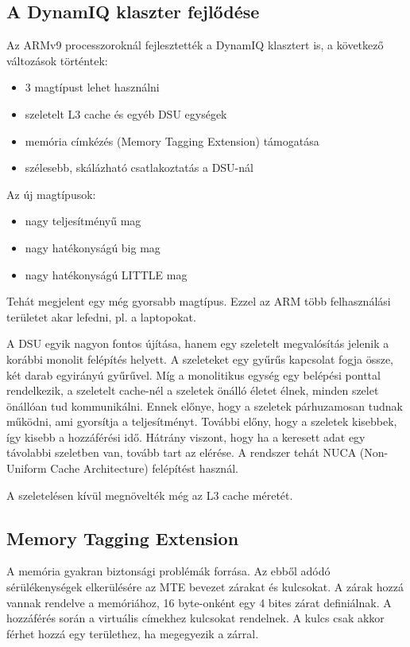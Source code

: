 \subsection{A DynamIQ klaszter fejlődése}
Az ARMv9 processzoroknál fejlesztették a DynamIQ klasztert is, a következő változások történtek:
\begin{itemize}
    \item 3 magtípust lehet használni
    \item szeletelt L3 cache és egyéb DSU egységek
    \item memória címkézés (Memory Tagging Extension) támogatása
    \item szélesebb, skálázható csatlakoztatás a DSU-nál
\end{itemize}

Az új magtípusok:
\begin{itemize}
    \item nagy teljesítményű mag
    \item nagy hatékonyságú big mag
    \item nagy hatékonyságú LITTLE mag
\end{itemize}
Tehát megjelent egy még gyorsabb magtípus.
Ezzel az ARM több felhasználási területet akar lefedni, pl. a laptopokat.

A DSU egyik nagyon fontos újítása, hanem egy szeletelt megvalósítás jelenik a korábbi monolit felépítés helyett.
A szeleteket egy gyűrűs kapcsolat fogja össze, két darab egyirányú gyűrűvel.
Míg a monolitikus egység egy belépési ponttal rendelkezik, a szeletelt cache-nél a szeletek önálló életet élnek, minden szelet önállóan tud kommunikálni.
Ennek előnye, hogy a szeletek párhuzamosan tudnak működni, ami gyorsítja a teljesítményt.
További előny, hogy a szeletek kisebbek, így kisebb a hozzáférési idő.
Hátrány viszont, hogy ha a keresett adat egy távolabbi szeletben van, tovább tart az elérése.
A rendszer tehát NUCA (Non-Uniform Cache Architecture) felépítést használ.

A szeletelésen kívül megnövelték még az L3 cache méretét.

\subsection{Memory Tagging Extension}
A memória gyakran biztonsági problémák forrása.
Az ebből adódó sérülékenységek elkerülésére az MTE bevezet zárakat és kulcsokat.
A zárak hozzá vannak rendelve a memóriához, 16 byte-onként egy 4 bites zárat definiálnak.
A hozzáférés során a virtuális címekhez kulcsokat rendelnek.
A kulcs csak akkor férhet hozzá egy területhez, ha megegyezik a zárral.

